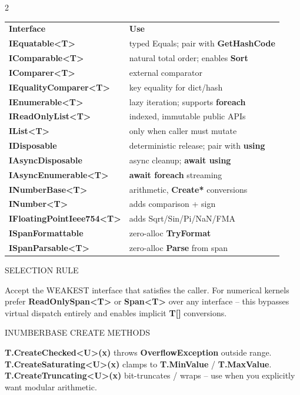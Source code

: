 \documentclass[9pt,a4paper]{extarticle}
\newenvironment{card}[3][acBlue]{%
  \begin{tcolorbox}[
    enhanced, colback=#2, colframe=bdCard,
    coltitle=black, colbacktitle=#2!70!bgHdr,
    fonttitle=\bfseries\fontsize{6.16pt}{7.48pt}\selectfont\MakeUppercase,
    title={#3},
    left=3pt, right=2pt, top=1.4pt, bottom=1.8pt,
    toptitle=1pt, bottomtitle=1pt,
    boxrule=0.4pt,
    borderline west={3pt}{0pt}{#1},
    arc=2pt, before skip=0pt, after skip=1.6mm,
    breakable, toprule at break=0pt, bottomrule at break=0pt,
  ]}{\end{tcolorbox}}
\newcommand{\sub}[1]{%
  \par\vspace{1.5pt}%
  {\fontsize{5.7pt}{7pt}\selectfont\color{gray}\MakeUppercase{#1}}\par
  \vspace{0.5pt}}
\newcommand{\code}[1]{{\ttfamily\bfseries #1}}
\begin{document}
\begin{multicols}{2}
\begin{card}[acBlue]{bgBlue}{Key Interfaces \& Selection Rules}
\fontsize{5.95pt}{7.6pt}\selectfont
\begin{tabular}{@{}p{31mm}@{\;}p{28mm}@{}}
\rowcolor{bgHdr}\textbf{Interface} & \textbf{Use}\\
\code{IEquatable<T>}        & typed Equals; pair with \code{GetHashCode}\\
\code{IComparable<T>}        & natural total order; enables \code{Sort}\\
\code{IComparer<T>}          & external comparator\\
\code{IEqualityComparer<T>} & key equality for dict/hash\\
\code{IEnumerable<T>}       & lazy iteration; supports \code{foreach}\\
\code{IReadOnlyList<T>}     & indexed, immutable public APIs\\
\code{IList<T>}             & only when caller must mutate\\
\code{IDisposable}          & deterministic release; pair with \code{using}\\
\code{IAsyncDisposable}     & async cleanup; \code{await using}\\
\code{IAsyncEnumerable<T>}  & \code{await foreach} streaming\\
\code{INumberBase<T>}       & arithmetic, \code{Create*} conversions\\
\code{INumber<T>}           & adds comparison + sign\\
\code{IFloatingPointIeee754<T>} & adds Sqrt/Sin/Pi/NaN/FMA\\
\code{ISpanFormattable}     & zero-alloc \code{TryFormat}\\
\code{ISpanParsable<T>}     & zero-alloc \code{Parse} from span\\
\end{tabular}
\sub{Selection rule}
{\fontsize{5.7pt}{7pt}\selectfont
Accept the WEAKEST interface that satisfies the caller. For numerical
kernels prefer \code{ReadOnlySpan<T>} or \code{Span<T>} over any
interface -- this bypasses virtual dispatch entirely and enables
implicit \code{T[]} conversions.}
\sub{INumberBase Create methods}
{\fontsize{5.7pt}{7pt}\selectfont
\code{T.CreateChecked<U>(x)} throws \code{OverflowException} outside range.\\
\code{T.CreateSaturating<U>(x)} clamps to \code{T.MinValue} / \code{T.MaxValue}.\\
\code{T.CreateTruncating<U>(x)} bit-truncates / wraps -- use when you
explicitly want modular arithmetic.}
\end{card}


\end{multicols}
\end{document}

